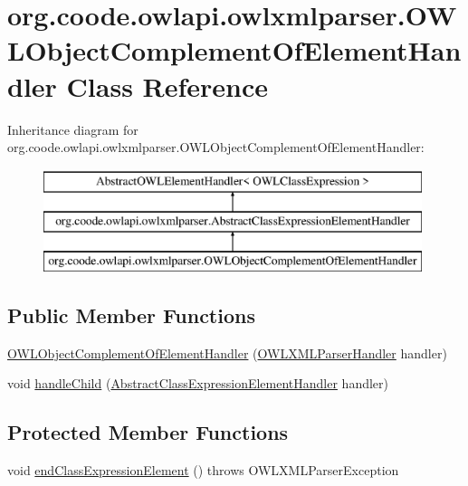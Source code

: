 \hypertarget{classorg_1_1coode_1_1owlapi_1_1owlxmlparser_1_1_o_w_l_object_complement_of_element_handler}{\section{org.\-coode.\-owlapi.\-owlxmlparser.\-O\-W\-L\-Object\-Complement\-Of\-Element\-Handler Class Reference}
\label{classorg_1_1coode_1_1owlapi_1_1owlxmlparser_1_1_o_w_l_object_complement_of_element_handler}
}
Inheritance diagram for org.\-coode.\-owlapi.\-owlxmlparser.\-O\-W\-L\-Object\-Complement\-Of\-Element\-Handler\-:\begin{figure}[H]
\begin{center}
\leavevmode
\includegraphics[height=3.000000cm]{classorg_1_1coode_1_1owlapi_1_1owlxmlparser_1_1_o_w_l_object_complement_of_element_handler}
\end{center}
\end{figure}
\subsection*{Public Member Functions}
\begin{DoxyCompactItemize}
\item 
\hyperlink{classorg_1_1coode_1_1owlapi_1_1owlxmlparser_1_1_o_w_l_object_complement_of_element_handler_afc793fcd2cd1e29faa14f68bdc831878}{O\-W\-L\-Object\-Complement\-Of\-Element\-Handler} (\hyperlink{classorg_1_1coode_1_1owlapi_1_1owlxmlparser_1_1_o_w_l_x_m_l_parser_handler}{O\-W\-L\-X\-M\-L\-Parser\-Handler} handler)
\item 
void \hyperlink{classorg_1_1coode_1_1owlapi_1_1owlxmlparser_1_1_o_w_l_object_complement_of_element_handler_a3d56e21941e03bf13806d27bad071b53}{handle\-Child} (\hyperlink{classorg_1_1coode_1_1owlapi_1_1owlxmlparser_1_1_abstract_class_expression_element_handler}{Abstract\-Class\-Expression\-Element\-Handler} handler)
\end{DoxyCompactItemize}
\subsection*{Protected Member Functions}
\begin{DoxyCompactItemize}
\item 
void \hyperlink{classorg_1_1coode_1_1owlapi_1_1owlxmlparser_1_1_o_w_l_object_complement_of_element_handler_a72834d2137220df8bd63fb695d5c722a}{end\-Class\-Expression\-Element} ()  throws O\-W\-L\-X\-M\-L\-Parser\-Exception 
\end{DoxyCompactItemize}
